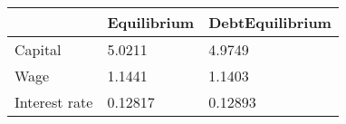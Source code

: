 \begin{tabular}{lll}
& Equilibrium & DebtEquilibrium \\ 
\hline 
Capital & 5.0211 & 4.9749 \\ 
Wage & 1.1441 & 1.1403 \\ 
Interest rate & 0.12817 & 0.12893 \\ 
\hline 
\end{tabular}